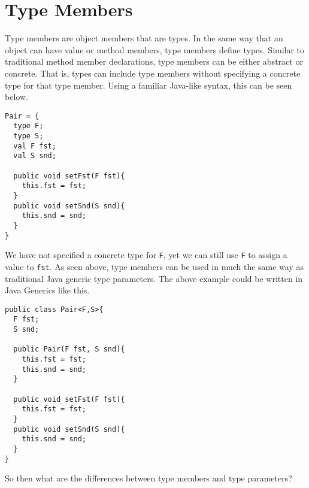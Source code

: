 \documentclass{llncs}
\begin{document}
\section{Type Members}
Type members are object members that are types. 
In the same way that an object can have value or 
method members, type members define types. Similar 
to traditional method member declarations, type 
members can be either abstract or concrete. That is, 
types can include type members without specifying 
a concrete type for that type member. Using a 
familiar Java-like syntax, this can be seen below.
\begin{lstlisting}[mathescape, style=custom_lang]
Pair = {
  type F;
  type S;
  val F fst;
  val S snd;

  public void setFst(F fst){
    this.fst = fst;
  }
  public void setSnd(S snd){
    this.snd = snd;
  }
}
\end{lstlisting}
We have not specified a concrete type for \texttt{F},
yet we can still use \texttt{F} to assign a value to 
\texttt{fst}.
As seen above, type members 
can be used in much the same way as traditional Java 
generic type parameters. The above example could be 
written in Java Generics like this.
\begin{lstlisting}[mathescape, style=custom_lang]
public class Pair<F,S>{
  F fst;
  S snd;

  public Pair(F fst, S snd){
    this.fst = fst;
    this.snd = snd;
  }

  public void setFst(F fst){
    this.fst = fst;
  }
  public void setSnd(S snd){
    this.snd = snd;
  }
}
\end{lstlisting}
So then what are the differences between type members 
and type parameters?
\end{document}
